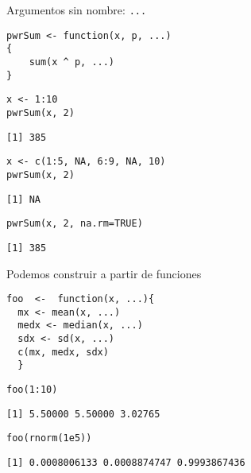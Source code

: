 \documentclass[xcolor={usenames,svgnames,dvipsnames}]{beamer}
\begin{document}
\begin{frame}[fragile,label={sec:orgdcf7b7e}]{Argumentos sin nombre: \texttt{...}}
 \lstset{language=r,label= ,caption= ,captionpos=b,numbers=none}
\begin{lstlisting}
pwrSum <- function(x, p, ...)
{
    sum(x ^ p, ...)
}
\end{lstlisting}

\lstset{language=r,label= ,caption= ,captionpos=b,numbers=none}
\begin{lstlisting}
x <- 1:10
pwrSum(x, 2)
\end{lstlisting}

\begin{verbatim}
[1] 385
\end{verbatim}

\lstset{language=r,label= ,caption= ,captionpos=b,numbers=none}
\begin{lstlisting}
x <- c(1:5, NA, 6:9, NA, 10)
pwrSum(x, 2)
\end{lstlisting}

\begin{verbatim}
[1] NA
\end{verbatim}

\lstset{language=r,label= ,caption= ,captionpos=b,numbers=none}
\begin{lstlisting}
pwrSum(x, 2, na.rm=TRUE)
\end{lstlisting}

\begin{verbatim}
[1] 385
\end{verbatim}
\end{frame}

\begin{frame}[fragile,label={sec:orgebcef5a}]{Podemos construir a partir de funciones}
 \lstset{language=r,label= ,caption= ,captionpos=b,numbers=none}
\begin{lstlisting}
foo  <-  function(x, ...){
  mx <- mean(x, ...)
  medx <- median(x, ...)
  sdx <- sd(x, ...)
  c(mx, medx, sdx)
  }
\end{lstlisting}

\lstset{language=r,label= ,caption= ,captionpos=b,numbers=none}
\begin{lstlisting}
foo(1:10)
\end{lstlisting}

\begin{verbatim}
[1] 5.50000 5.50000 3.02765
\end{verbatim}

\lstset{language=r,label= ,caption= ,captionpos=b,numbers=none}
\begin{lstlisting}
foo(rnorm(1e5))
\end{lstlisting}

\begin{verbatim}
[1] 0.0008006133 0.0008874747 0.9993867436
\end{verbatim}
\end{frame}
\end{document}
